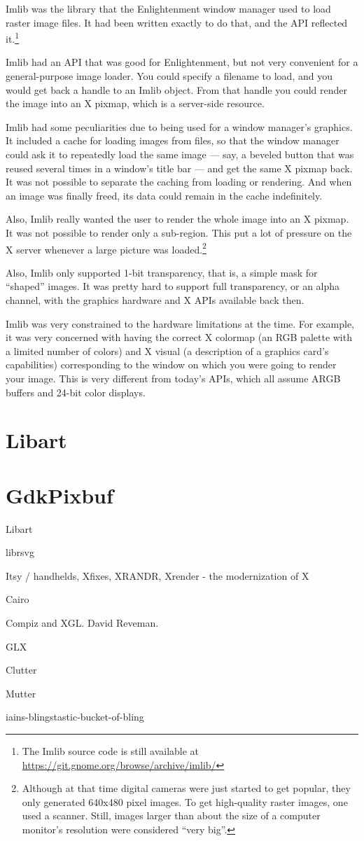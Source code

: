 Imlib was the library that the Enlightenment window manager used to
load raster image files.  It had been written exactly to do that, and
the API reflected it.\footnote{The Imlib source code is still
  available at \url{https://git.gnome.org/browse/archive/imlib/}}

Imlib had an API that was good for Enlightenment, but not very
convenient for a general-purpose image loader.  You could specify a
filename to load, and you would get back a handle to an Imlib object.
From that handle you could render the image into an X pixmap, which is
a server-side resource.

Imlib had some peculiarities due to being used for a window manager's
graphics.  It included a cache for loading images from files, so that
the window manager could ask it to repeatedly load the same image ---
say, a beveled button that was reused several times in a window's
title bar --- and get the same X pixmap back.  It was not possible to
separate the caching from loading or rendering.  And when an image was
finally freed, its data could remain in the cache indefinitely.

Also, Imlib really wanted the user to render the whole image into an X
pixmap.  It was not possible to render only a sub-region.  This put a
lot of pressure on the X server whenever a large picture was
loaded.\footnote{Although at that time digital cameras were just
  started to get popular, they only generated 640x480 pixel images.
  To get high-quality raster images, one used a scanner.  Still,
  images larger than about the size of a computer monitor's resolution
  were considered ``very big''.}

Also, Imlib only supported 1-bit transparency, that is, a simple mask
for ``shaped'' images.  It was pretty hard to support full
transparency, or an alpha channel, with the graphics hardware and X
APIs available back then.

Imlib was very constrained to the hardware limitations at the time.
For example, it was very concerned with having the correct X colormap
(an RGB palette with a limited number of colors) and X visual (a
description of a graphics card's capabilities) corresponding to the
window on which you were going to render your image.  This is very
different from today's APIs, which all assume ARGB buffers and 24-bit
color displays.

\section{Libart}



\section{GdkPixbuf}



Libart

librsvg

Itsy / handhelds, Xfixes, XRANDR, Xrender - the modernization of X

Cairo

Compiz and XGL.  David Reveman.

GLX

Clutter

Mutter

iains-blingstastic-bucket-of-bling
